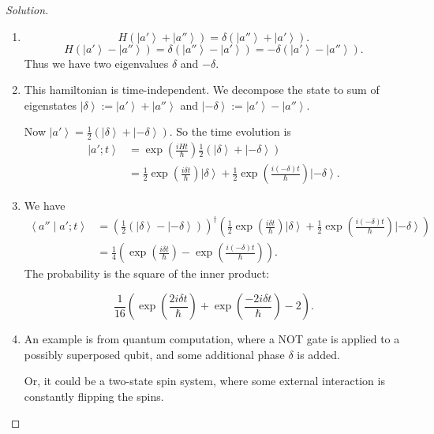 \begin{proof}[Solution]
	\begin{enumerate}
		\item [(a)] 
			\[
				H\left( \left| a' \right\rangle +\left| a'' \right\rangle  \right)  =\delta \left( \left| a'' \right\rangle  + \left| a' \right\rangle  \right) 
			.\] 
			\[
				H\left( \left| a' \right\rangle  - \left| a'' \right\rangle  \right)  = \delta \left( \left| a'' \right\rangle  - \left| a' \right\rangle  \right) = - \delta\left( \left| a' \right\rangle  - \left| a'' \right\rangle  \right) 
			.\] 
			Thus we have two eigenvalues $\delta$ and $-\delta$.
		\item This hamiltonian is time-independent. We decompose the state to sum of eigenstates $\left| \delta \right\rangle := \left| a' \right\rangle  + \left| a'' \right\rangle  $ and $\left| -\delta \right\rangle := \left| a' \right\rangle  - \left| a'' \right\rangle $.

		Now $\left| a' \right\rangle  = \frac{1}{2} \left( \left| \delta \right\rangle  + \left| -\delta \right\rangle  \right) $. So the time evolution is
		\begin{align*}
			\left| a' ; t \right\rangle 
			&= \exp\left( \frac{i H t}{\hbar} \right) \frac{1}{2} \left( \left| \delta \right\rangle  + \left| -\delta \right\rangle  \right)  \\
			&= \frac{1}{2}\exp\left( \frac{i \delta t}{\hbar} \right) \left| \delta \right\rangle 
			+ \frac{1}{2} \exp\left(\frac{ i (-\delta) t}{\hbar} \right)\left| -\delta \right\rangle 
		.\end{align*}
	\item 
		We have
		\begin{align*}
			\left\langle a'' \middle| a' ; t \right\rangle  
			&= \left( \frac{1}{2}\left( \left| \delta \right\rangle  - \left| -\delta \right\rangle  \right)  \right) ^\dag \left( \frac{1}{2}\exp\left( \frac{i \delta t}{\hbar} \right) \left| \delta \right\rangle 
			+ \frac{1}{2} \exp\left(\frac{ i (-\delta) t}{\hbar} \right)\left| -\delta \right\rangle \right)  \\
			&= \frac{1}{4} \left( \exp\left( \frac{i \delta t}{\hbar} \right) - \exp\left( \frac{i (-\delta) t}{\hbar} \right)  \right) 
		.\end{align*} 
		The probability is the square of the inner product:

		\[
			\frac{1}{16}\left( \exp\left( \frac{2 i \delta t}{\hbar} \right) + \exp\left( \frac{- 2 i \delta t}{\hbar} \right) - 2   \right) 
		.\] 

		\item
			An example is from quantum computation, where a NOT gate is applied to a possibly superposed qubit, and some additional phase $\delta$ is added.

			Or, it could be a two-state spin system, where some external interaction is constantly flipping the spins.
	\end{enumerate}
\end{proof}

